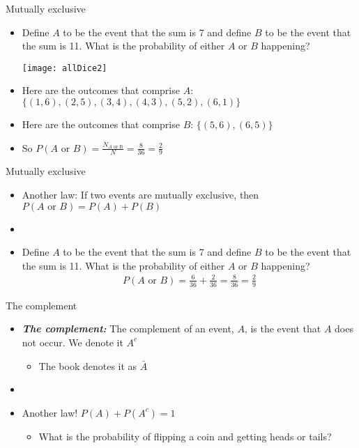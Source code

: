 \documentclass[xcolor=dvipsnames]{beamer}
\begin{document}
\begin{frame}{Mutually exclusive}
	\begin{itemize}
		\item Define $A$ to be the event that the sum is 7 and define $B$ to be the event that the sum is 11. What is the probability of either $A$ or $B$ happening?
		\begin{center}
			\texttt{[image: allDice2]}
		\end{center}
		\item Here are the outcomes that comprise $A$: $\{(1,6), (2,5), (3,4), (4,3), (5,2), (6,1)\}$
		\item Here are the outcomes that comprise $B$: $\{(5,6), (6,5)\}$
		\item So $P(A \text{ or } B) = \frac{N_{A\text{ or B}}}{N} = \frac{8}{36} = \frac{2}{9}$
	\end{itemize}
\end{frame}

\begin{frame}{Mutually exclusive}
\begin{itemize}
	\item Another law: If two events are mutually exclusive, then $P(A \text{ or } B) = P(A) + P(B)$
	\item[]
	\item Define $A$ to be the event that the sum is 7 and define $B$ to be the event that the sum is 11. What is the probability of either $A$ or $B$ happening?
	\begin{gather*}
		P(A \text{ or } B) = \frac{6}{36} + \frac{2}{36} = \frac{8}{36} = \frac{2}{9}
	\end{gather*}
\end{itemize}
\end{frame}

\begin{frame}{The complement}
	\begin{itemize}
		\item \textbf{\emph{The complement:}} The complement of an event, $A$, is the event that $A$ does not occur. We denote it $A^c$
		\begin{itemize}
			\item The book denotes it as $\bar{A}$
		\end{itemize}
	\item[]
	\item Another law! $P(A) + P(A^c) = 1$
	\begin{itemize}
		\item What is the probability of flipping a coin and getting heads or tails?
	\end{itemize}
	\end{itemize}
\end{frame}
\end{document}
